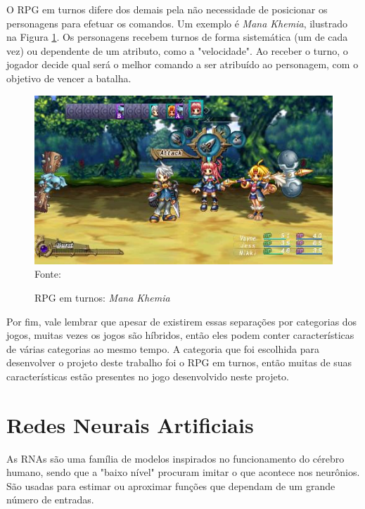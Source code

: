 \documentclass[
	12pt,					%
	openright,				%
	oneside,				%
	a4paper,				%
	bibjustif,				%
	chapter=TITLE,			%
	english,				%
	brazil,					%
	]{abntex2}
\newcommand{\source}[1]{\small Fonte: {#1}}
\begin{document}
		O RPG em turnos difere dos demais pela não necessidade de posicionar os personagens para efetuar os comandos.
		Um exemplo é \textit{Mana Khemia}, ilustrado na Figura \ref{fig:manaKhemia}.
		Os personagens recebem turnos de forma sistemática
		(um de cada vez)
		ou dependente de um atributo,
		 como a "velocidade".
		Ao receber o turno, o jogador decide qual será o melhor comando a ser atribuído ao personagem,
		com o objetivo de vencer a batalha.
		
		\begin{figure}[ht!]
			\caption{RPG em turnos: \textit{Mana Khemia}}
			\centering
			\includegraphics[scale=0.55]{img/mana-khemia.jpg}\\
			\vspace{0.5mm}
			\source{}
			\label{fig:manaKhemia}
		\end{figure}
		
		Por fim, vale lembrar que apesar de existirem essas separações por categorias dos jogos,
		muitas vezes os jogos são híbridos,
		então eles podem conter características de várias categorias ao mesmo tempo.
		A categoria que foi escolhida para desenvolver o projeto deste trabalho foi o RPG em turnos,
		então muitas de suas características estão presentes no jogo desenvolvido neste projeto.
		

	\FloatBarrier
	\section{Redes Neurais Artificiais}
	As RNAs são uma família de modelos inspirados no funcionamento do cérebro humano,
	sendo que a "baixo nível"{} procuram imitar o que acontece nos neurônios.
	São usadas para estimar ou aproximar funções que dependam de um grande número de entradas.
	
\end{document}
